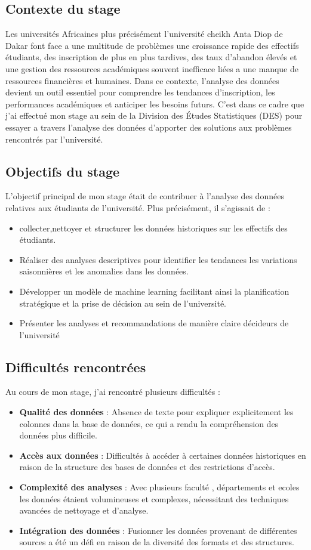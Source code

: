 \subsection{Contexte du stage}
Les universités Africaines plus précisément l'université cheikh Anta Diop de Dakar font face a une multitude de problèmes une croissance rapide des effectifs étudiants, des inscription de plus en plus tardives, des taux d'abandon élevés et une gestion des ressources académiques souvent inefficace liées a une manque de ressources financières et humaines. 
Dans ce contexte, l'analyse des données devient un outil essentiel pour comprendre les tendances d'inscription, les performances académiques et anticiper les besoins futurs.
C'est dans ce cadre que j'ai effectué mon stage au sein de la Division des Études Statistiques (DES) pour essayer a travers l'analyse des données d'apporter des solutions aux problèmes rencontrés par l'université.
\subsection{Objectifs du stage}
L'objectif principal de mon stage était de contribuer à l'analyse des données relatives aux étudiants de l'université. Plus précisément, il s'agissait de :
\begin{itemize}
    \item collecter,nettoyer et structurer les données historiques sur les effectifs des étudiants.
    \item Réaliser des analyses descriptives pour identifier les tendances les variations saisonnières et les anomalies dans les données.
    \item Développer un modèle de machine learning facilitant
    ainsi la planification stratégique et la prise de décision au sein de l'université. 
    \item Présenter les analyses et recommandations de manière claire décideurs de l'université 
\end{itemize}
\subsection{Difficultés rencontrées}
Au cours de mon stage, j'ai rencontré plusieurs difficultés :
\begin{itemize}
    \item \textbf{Qualité des données} : Absence de texte pour expliquer explicitement les colonnes dans la base de données, ce qui a rendu la compréhension des données plus difficile.
    \item \textbf{Accès aux données} : Difficultés à accéder à certaines données historiques en raison de la structure des bases de données et des restrictions d'accès.
    \item \textbf{Complexité des analyses} : Avec plusieurs faculté , départements et ecoles les données étaient volumineuses et complexes, nécessitant des techniques avancées de nettoyage et d'analyse.
    \item \textbf{Intégration des données} : Fusionner les données provenant de différentes sources a été un défi en raison de la diversité des formats et des structures.
    \end{itemize}